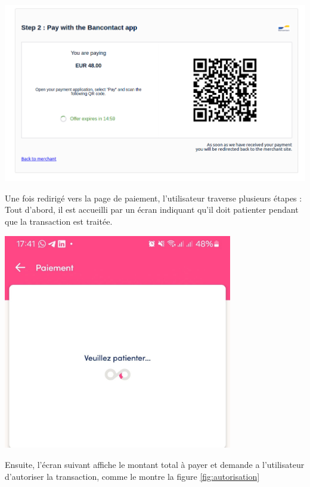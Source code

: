 \begin{center}
    \centering
    \includegraphics[width=19cm]{Figures/Screens/redirection.png}
    \label{fig:qr}
\end{center}
Une fois redirigé vers la page de paiement, l'utilisateur traverse plusieurs étapes :
Tout d'abord, il est accueilli par un écran indiquant qu'il doit patienter pendant que la transaction est traitée. 
\begin{center}
    \centering
    \includegraphics[width=10cm]{Figures/Screens/patience.jpeg}
    \label{fig:patience}
\end{center}
Ensuite, l'écran suivant affiche le montant total à payer et demande a l'utilisateur d'autoriser la transaction, comme le montre la figure \ref{fig:autorisation}
